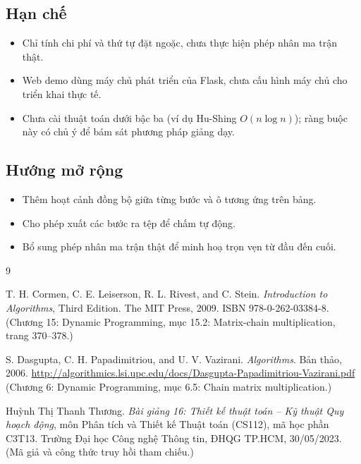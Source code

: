 \documentclass[12pt,a4paper]{article}
\begin{document}
\subsection{Hạn chế}
\begin{itemize}
  \item Chỉ tính chi phí và thứ tự đặt ngoặc, chưa thực hiện phép nhân ma trận thật.
  \item Web demo dùng máy chủ phát triển của Flask, chưa cấu hình máy chủ cho triển khai thực tế.
  \item Chưa cài thuật toán dưới bậc ba (ví dụ Hu-Shing $O(n \log n)$); ràng buộc này có chủ ý để bám sát phương pháp giảng dạy.
\end{itemize}

\subsection{Hướng mở rộng}
\begin{itemize}
  \item Thêm hoạt cảnh đồng bộ giữa từng bước và ô tương ứng trên bảng.
  \item Cho phép xuất các bước ra tệp để chấm tự động.
  \item Bổ sung phép nhân ma trận thật để minh hoạ trọn vẹn từ đầu đến cuối.
\end{itemize}

\begin{thebibliography}{9}

T. H. Cormen, C. E. Leiserson, R. L. Rivest, and C. Stein.
\newblock \emph{Introduction to Algorithms}, Third Edition.
\newblock The MIT Press, 2009.
\newblock ISBN 978-0-262-03384-8.
\newblock (Chương 15: Dynamic Programming, mục 15.2: Matrix-chain multiplication,
    trang 370--378.)

S. Dasgupta, C. H. Papadimitriou, and U. V. Vazirani.
\newblock \emph{Algorithms}.
\newblock Bản thảo, 2006. \url{http://algorithmics.lsi.upc.edu/docs/Dasgupta-Papadimitriou-Vazirani.pdf}
\newblock (Chương 6: Dynamic Programming, mục 6.5: Chain matrix multiplication.)

Huỳnh Thị Thanh Thương.
\newblock \emph{Bài giảng 16: Thiết kế thuật toán -- Kỹ thuật Quy hoạch động},
    môn Phân tích và Thiết kế Thuật toán (CS112), mã học phần C3T13.
\newblock Trường Đại học Công nghệ Thông tin, ĐHQG TP.HCM, 30/05/2023.
\newblock (Mã giả và công thức truy hồi tham chiếu.)

\end{thebibliography}
\end{document}
